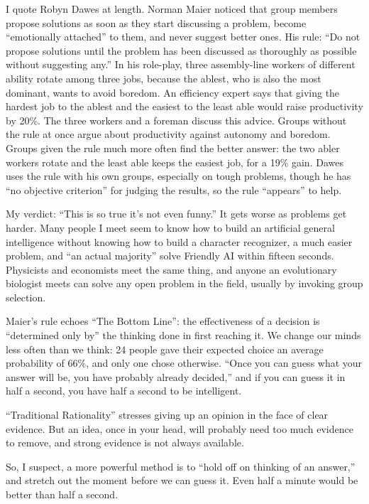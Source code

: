 
I quote Robyn Dawes at length. Norman Maier noticed that group members propose solutions as soon as they start discussing a problem, become ``emotionally attached'' to them, and never suggest better ones. His rule: ``Do not propose solutions until the problem has been discussed as thoroughly as possible without suggesting any.'' In his role-play, three assembly-line workers of different ability rotate among three jobs, because the ablest, who is also the most dominant, wants to avoid boredom. An efficiency expert says that giving the hardest job to the ablest and the easiest to the least able would raise productivity by 20\%. The three workers and a foreman discuss this advice. Groups without the rule at once argue about productivity against autonomy and boredom. Groups given the rule much more often find the better answer: the two abler workers rotate and the least able keeps the easiest job, for a 19\% gain. Dawes uses the rule with his own groups, especially on tough problems, though he has ``no objective criterion'' for judging the results, so the rule ``appears'' to help. 

My verdict: ``This is so true it's not even funny.'' It gets worse as problems get harder. Many people I meet seem to know how to build an artificial general intelligence without knowing how to build a character recognizer, a much easier problem, and ``an actual majority'' solve Friendly AI within fifteen seconds.  Physicists and economists meet the same thing, and anyone an evolutionary biologist meets can solve any open problem in the field, usually by invoking group selection.

Maier's rule echoes ``The Bottom Line'': the effectiveness of a decision is ``determined only by'' the thinking done in first reaching it. We change our minds less often than we think: 24 people gave their expected choice an average probability of 66\%, and only one chose otherwise. ``Once you can guess what your answer will be, you have probably already decided,'' and if you can guess it in half a second, you have half a second to be intelligent. 

``Traditional Rationality'' stresses giving up an opinion in the face of clear evidence. But an idea, once in your head, will probably need too much evidence to remove, and strong evidence is not always available.

So, I suspect, a more powerful method is to ``hold off on thinking of an answer,'' and stretch out the moment before we can guess it. Even half a minute would be better than half a second. 
